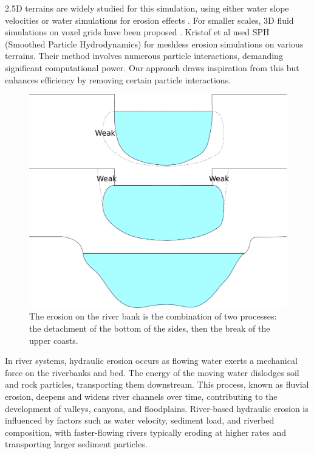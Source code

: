 2.5D terrains are widely studied for this simulation, using either water slope velocities \cite{Neidhold2005} or water simulations for erosion effects \cite{Mei2007}. For smaller scales, 3D fluid simulations on voxel grids have been proposed \cite{Benes2006}. Kristof et al \cite{Kristof2009} used SPH (Smoothed Particle Hydrodynamics) for meshless erosion simulations on various terrains. Their method involves numerous particle interactions, demanding significant computational power. Our approach draws inspiration from this but enhances efficiency by removing certain particle interactions.


\begin{figure}
    \includegraphics[width=\linewidth]{river_erosion.pdf}
    \caption{The erosion on the river bank is the combination of two processes: the detachment of the bottom of the sides, then the break of the upper coasts. }
    \label{fig:erosion_river-erosion-profile}
\end{figure}

In river systems, hydraulic erosion occurs as flowing water exerts a mechanical force on the riverbanks and bed. The energy of the moving water dislodges soil and rock particles, transporting them downstream. This process, known as fluvial erosion, deepens and widens river channels over time, contributing to the development of valleys, canyons, and floodplains. River-based hydraulic erosion is influenced by factors such as water velocity, sediment load, and riverbed composition, with faster-flowing rivers typically eroding at higher rates and transporting larger sediment particles.

